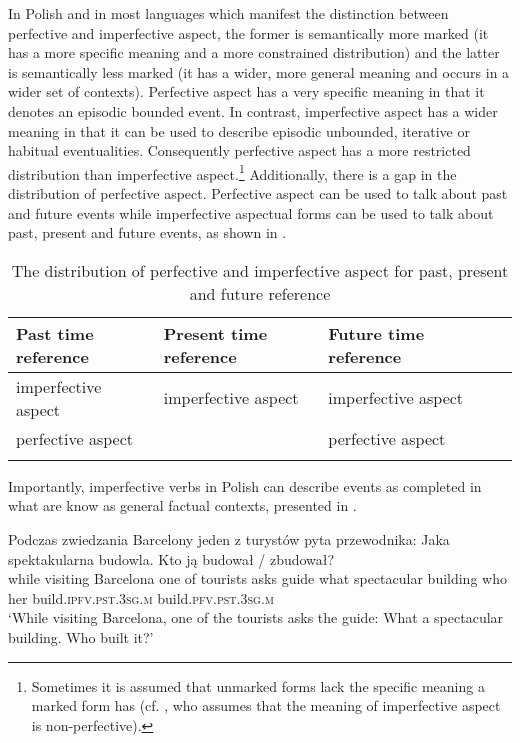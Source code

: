 \documentclass[output=paper]{langscibook}
\begin{document}
In Polish and in most languages which manifest the distinction between perfective and imperfective aspect, the former is semantically more marked (it has a more specific meaning and a more constrained distribution) and the latter is semantically less marked (it has a wider, more general meaning and occurs in a wider set of contexts). Perfective aspect has a very specific meaning in that it denotes an episodic bounded event.
In contrast, imperfective aspect has a wider meaning in that it can be used to describe episodic unbounded, iterative or habitual eventualities. Consequently perfective aspect has a more restricted distribution than imperfective aspect.\footnote{Sometimes it is assumed that unmarked forms lack the specific meaning a marked form has (cf. \citealt{Borik20022006}, who assumes that the meaning of imperfective aspect is non-perfective).} Additionally, there is a gap in the distribution of perfective aspect. Perfective aspect can be used to talk about past and future events while imperfective aspectual forms can be used to talk about past, present and future events, as shown in 
.

\begin{table}
\caption{The distribution of perfective and imperfective aspect for past, present and future reference}
\label{jan-bla:fansb:kb:tab1}
 \begin{tabular}{lllll}
  \lsptoprule
            Past time reference & Present time reference & Future time reference\\
  \midrule
    imperfective aspect  &    imperfective aspect     & imperfective aspect\\
    perfective aspect &     & perfective aspect\\
  \lspbottomrule
 \end{tabular}
\end{table}

Importantly, imperfective verbs in Polish can describe events as completed in what are know as general factual contexts, presented in .

\ea
\gll Podczas zwiedzania Barcelony jeden z turystów pyta przewodnika: Jaka spektakularna budowla. Kto ją budował / zbudował?\\  
     while visiting Barcelona one of tourists asks guide what spectacular building who her build.\textsc{ipfv}.\textsc{pst}.\textsc{3sg}.\textsc{m} {} build.\textsc{pfv}.\textsc{pst}.\textsc{3sg}.\textsc{m} \\
\glt ‘While visiting Barcelona, one of the tourists asks the guide: What a spectacular building. Who built it?’\label{jan-bla:fansb:kb:ex7}
\z
\end{document}
